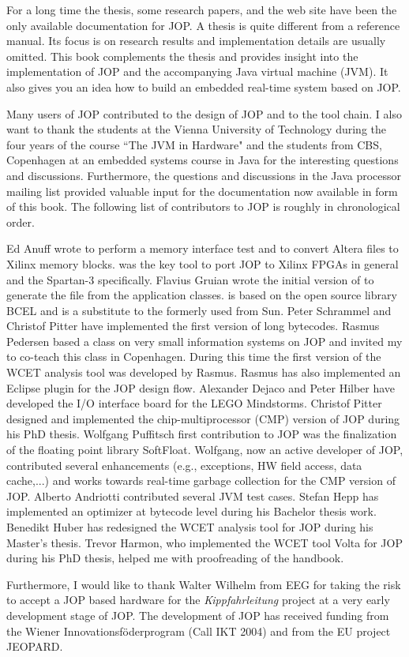 For a long time the thesis, some research papers, and the web site
have been the only available documentation for JOP. A thesis is quite
different from a reference manual. Its focus is on research results
and implementation details are usually omitted. This book complements
the thesis and provides insight into the implementation of JOP and
the accompanying Java virtual machine (JVM). It also gives you an
idea how to build an embedded real-time system based on JOP.


Many users of JOP contributed to the design of JOP and to the tool
chain. I also want to thank the students at the Vienna University of
Technology during the four years of the course ``The JVM in Hardware"
and the students from CBS, Copenhagen at an embedded systems course
in Java for the interesting questions and discussions. Furthermore,
the questions and discussions in the Java processor mailing list
provided valuable input for the documentation now available in form
of this book. The following list of contributors to JOP is roughly in
chronological order.

Ed Anuff wrote  to perform a memory interface test
and  to convert Altera  files to
Xilinx memory blocks.  was the key tool to port
JOP to Xilinx FPGAs in general and the Spartan-3 specifically.
Flavius Gruian wrote the initial version of  to generate
the  file from the application classes.  is
based on the open source library BCEL and is a substitute to the
formerly used  from Sun. Peter Schrammel and
Christof Pitter have implemented the first version of long bytecodes.
Rasmus Pedersen based a class on very small information systems on
JOP and invited my to co-teach this class in Copenhagen. During this
time the first version of the WCET analysis tool was developed by
Rasmus. Rasmus has also implemented an Eclipse plugin for the JOP
design flow. Alexander Dejaco and Peter Hilber have developed the I/O
interface board for the LEGO Mindstorms. Christof Pitter designed and
implemented the chip-multiprocessor (CMP) version of JOP during his
PhD thesis. Wolfgang Puffitsch first contribution to JOP was the
finalization of the floating point library SoftFloat. Wolfgang, now
an active developer of JOP, contributed several enhancements (e.g.,
exceptions, HW field access, data cache,...) and works towards
real-time garbage collection for the CMP version of JOP. Alberto
Andriotti contributed several JVM test cases. Stefan Hepp has
implemented an optimizer at bytecode level during his Bachelor thesis
work. Benedikt Huber has redesigned the WCET analysis tool for JOP
during his Master's thesis. Trevor Harmon, who implemented the WCET
tool Volta for JOP during his PhD thesis, helped me with proofreading
of the handbook.

Furthermore, I would like to thank Walter Wilhelm from EEG for taking
the risk to accept a JOP based hardware for the
\emph{Kippfahrleitung} project at a very early development stage of
JOP. The development of JOP has received funding from the Wiener
Innovationsf\"oderprogram (Call IKT 2004) and from the EU project
JEOPARD.
